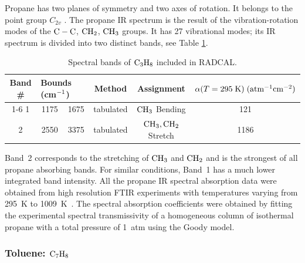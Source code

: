 Propane has two planes of symmetry and two axes of rotation. It belongs to the point group $C_{2v}$ \cite{Herzberg:1949}. The propane IR spectrum is the result of the vibration-rotation modes of the $\rm C-C$, $\rm CH_2$, $\rm CH_3$ groups. It has 27 vibrational modes; its IR spectrum is divided into two distinct bands, see Table \ref{Table::C3H8}.
\begin{table}[ht]
   \centering
   \caption[Spectral bands of $\rm C_3H_8$ included in RADCAL]{Spectral bands of $\rm C_3H_8$ included in RADCAL.}
   \vspace{0.1in}
   \label{Table::C3H8}
   \begin{tabular}{|c|c|c|c|c|c|}
    \hline
    Band \# & \multicolumn{2}{|l|}{Bounds (cm$\rm ^{-1}$) } & Method & Assignment & $\alpha(T=295 \; {\rm K}) \; (\rm {atm^{-1} cm^{-2}})$ \\
    \cline{1-6}
    1 & 1175 & 1675 & tabulated &  $\rm CH_3$ Bending        & 121 \\
    2 & 2550 & 3375 & tabulated &  $\rm CH_3, CH_2$ Stretch  & 1186 \\
    \hline
   \end{tabular}
\end{table}
Band~2 corresponds to the stretching of $\rm CH_3$ and $\rm CH_2$ and is the strongest of all propane absorbing bands. For similar conditions, Band~1 has a much lower integrated band intensity. All the propane IR spectral absorption data were obtained from high resolution FTIR experiments with temperatures varying from 295~K to 1009~K~\cite{Wakatsuki:2005}. The spectral absorption coefficients were obtained by fitting the experimental spectral transmissivity of a homogeneous column of isothermal propane with a total pressure of 1~atm using the Goody model.

\subsubsection{Toluene: $\rm C_7H_8$}

